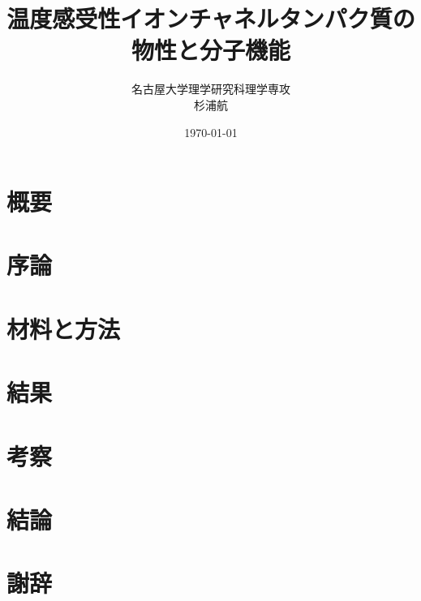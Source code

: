 \documentclass{ltjsreport}
\title{温度感受性イオンチャネルタンパク質の物性と分子機能}
\author{名古屋大学理学研究科理学専攻\\杉浦航}
\date{\today}
\begin{document}
\maketitle

\chapter*{概要}


\tableofcontents
\clearpage

\chapter{序論}


\chapter{材料と方法}


\chapter{結果}


\chapter{考察}


\chapter{結論}


\chapter{謝辞}


\printbibliography[title=参考文献]
\end{document}
